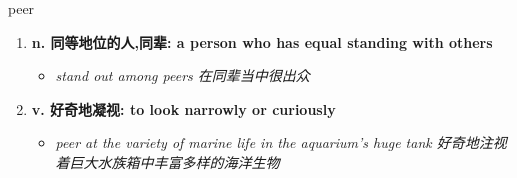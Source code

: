 
\begin{frame}
{\huge peer}
\begin{center}
\begin{enumerate}\Large
  \item \textbf{n. 同等地位的人,同辈: a person who has equal standing with others}
  \begin{itemize}
    \item \em{\Large{stand out among peers 在同辈当中很出众}}
  \end{itemize}
  \item \textbf{v. 好奇地凝视: to look narrowly or curiously}
  \begin{itemize}
    \item \em{\Large{peer at the variety of marine life in the aquarium's huge tank 好奇地注视着巨大水族箱中丰富多样的海洋生物}}
  \end{itemize}
\end{enumerate}
\end{center}
\end{frame}

